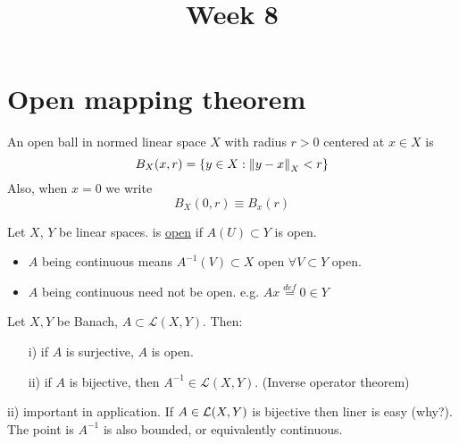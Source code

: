 \documentclass{article}
\title{Week 8}
\begin{document}
\maketitle
\section{Open mapping theorem}
\begin{definition}\nl
An open ball in normed linear space $X$ with radius $r>0$ centered at $x\in X$ is
$$
B_X(x,r)=\{y\in X:\left\|{y-x}\right\|_X<r\}
$$
Also, when $x=0$ we write 
$$
B_X(0,r)\equiv B_x(r)
$$
\end{definition}

\begin{definition}\nl
	Let $X$, $Y$ be linear spaces.  is {\underline{open}} if $A(U)\subset Y $ is open.
\end{definition}
\begin{remark}\hfill

\begin{itemize}
    \item $A$ being continuous means $A^{-1}(V)\subset{X}$ open $\forall V\subset Y$ open.
    \item $A$ being continuous need not be open. e.g. $Ax\stackrel{def}{=}0\in Y$
\end{itemize}
\end{remark}

\begin{theorem}\nl
	Let $X,Y$ be Banach, $A\subset\mathcal{L}(X,Y)$. Then:
	\begin{itemize}
	    \item[i)] if $A$ is surjective, $A$ is open.
	    \item[ii)] if $A$ is bijective, then $A^{-1}\in \mathcal{L}(X,Y)$. (Inverse operator theorem)
	\end{itemize}
\end{theorem}

\begin{remark}\nl
ii) important in application. If $A\in\mathcal{L}({X},{Y})$ is bijective then  liner is easy (why?). The point is $A^{-1}$ is also bounded, or equivalently continuous.
\end{remark}
\end{document}
